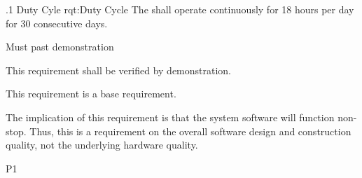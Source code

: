 \ONERQMTV
{\RqtNumberBase.1}
{Duty Cyle}
{rqt:Duty Cycle}
{The \ThisSystem shall operate continuously for 18 hours per day for 30 consecutive days.}
{
	\item [Phase 1] Must past demonstration
}
{This requirement shall be verified by demonstration.}
{
	\item [N/A] This requirement is a base requirement.
}
{
	\item The implication of this requirement is that the system software will function non-stop. Thus, this is a requirement on the overall software design and construction quality, not the underlying hardware quality.
}
{P1}


